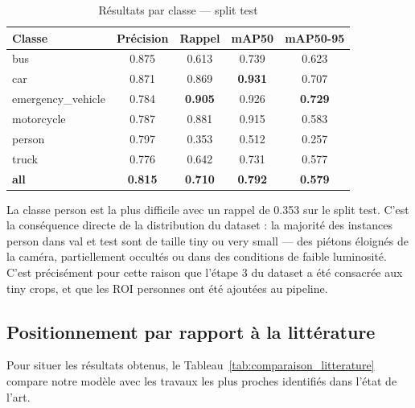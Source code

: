 \begin{table}[H]
\centering
\caption{Résultats par classe — split test}
\small
\begin{tabularx}{\textwidth}{lcccc}
\toprule
\textbf{Classe} &
\textbf{Précision} &
\textbf{Rappel} &
\textbf{mAP50} &
\textbf{mAP50-95} \\
\midrule
bus &
0.875 & 0.613 & 0.739 & 0.623 \\
car &
0.871 & 0.869 & \textbf{0.931} & 0.707 \\
emergency\_vehicle &
0.784 & \textbf{0.905} & 0.926 & \textbf{0.729} \\
motorcycle &
0.787 & 0.881 & 0.915 & 0.583 \\
person &
0.797 & 0.353 & 0.512 & 0.257 \\
truck &
0.776 & 0.642 & 0.731 & 0.577 \\
\midrule
\textbf{all} &
\textbf{0.815} & \textbf{0.710} &
\textbf{0.792} & \textbf{0.579} \\
\bottomrule
\end{tabularx}
\label{tab:class_results}
\end{table}

La classe person est la plus difficile
avec un rappel de 0.353 sur le split test.
C'est la conséquence directe de la
distribution du dataset : la majorité
des instances person dans val et test
sont de taille tiny ou very small —
des piétons éloignés de la caméra,
partiellement occultés ou dans des
conditions de faible luminosité. C'est
précisément pour cette raison que l'étape
3 du dataset a été consacrée aux tiny
crops, et que les ROI personnes ont été
ajoutées au pipeline.

\subsection{Positionnement par rapport
            à la littérature}

Pour situer les résultats obtenus, le
Tableau~\ref{tab:comparaison_litterature}
compare notre modèle avec les travaux
les plus proches identifiés dans l'état
de l'art.

